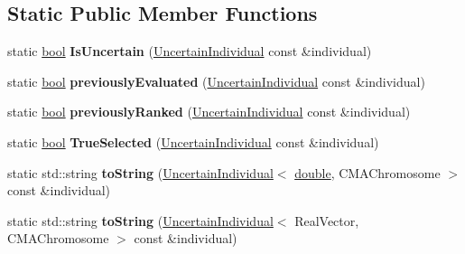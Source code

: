 \subsection*{Static Public Member Functions}
\begin{DoxyCompactItemize}
\item 
static \hyperlink{classbool}{bool} {\bfseries Is\+Uncertain} (\hyperlink{classUncertainIndividual}{Uncertain\+Individual} const \&individual)\hypertarget{classUncertainIndividual_abd89cab2c5639c817015f87e9cac83ee}{}\label{classUncertainIndividual_abd89cab2c5639c817015f87e9cac83ee}

\item 
static \hyperlink{classbool}{bool} {\bfseries previously\+Evaluated} (\hyperlink{classUncertainIndividual}{Uncertain\+Individual} const \&individual)\hypertarget{classUncertainIndividual_a3d7cec28603aa907af94f523662326ad}{}\label{classUncertainIndividual_a3d7cec28603aa907af94f523662326ad}

\item 
static \hyperlink{classbool}{bool} {\bfseries previously\+Ranked} (\hyperlink{classUncertainIndividual}{Uncertain\+Individual} const \&individual)\hypertarget{classUncertainIndividual_a9116510caf6a82a5e8dc6c68f5c7b6d5}{}\label{classUncertainIndividual_a9116510caf6a82a5e8dc6c68f5c7b6d5}

\item 
static \hyperlink{classbool}{bool} {\bfseries True\+Selected} (\hyperlink{classUncertainIndividual}{Uncertain\+Individual} const \&individual)\hypertarget{classUncertainIndividual_a2618a82188eb184991c0152a2815b328}{}\label{classUncertainIndividual_a2618a82188eb184991c0152a2815b328}

\item 
static std\+::string {\bfseries to\+String} (\hyperlink{classUncertainIndividual}{Uncertain\+Individual}$<$ \hyperlink{classdouble}{double}, C\+M\+A\+Chromosome $>$ const \&individual)\hypertarget{classUncertainIndividual_a23f6906e347c6ad0d74e7e871fd51584}{}\label{classUncertainIndividual_a23f6906e347c6ad0d74e7e871fd51584}

\item 
static std\+::string {\bfseries to\+String} (\hyperlink{classUncertainIndividual}{Uncertain\+Individual}$<$ Real\+Vector, C\+M\+A\+Chromosome $>$ const \&individual)\hypertarget{classUncertainIndividual_a7a3832e99216ccfa25b2431bd0594073}{}\label{classUncertainIndividual_a7a3832e99216ccfa25b2431bd0594073}

\end{DoxyCompactItemize}
